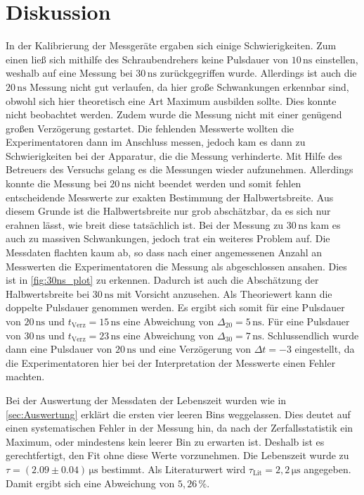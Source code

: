 \section{Diskussion}
\label{sec:Diskussion}

In der Kalibrierung der Messgeräte ergaben sich einige Schwierigkeiten.
Zum einen ließ sich mithilfe des Schraubendrehers keine Pulsdauer von $10 \, \unit{\nano\second}$ einstellen, weshalb auf eine Messung bei $30 \, \unit{\nano\second}$ zurückgegriffen wurde.
Allerdings ist auch die $20 \, \unit{\nano\second}$ Messung nicht gut verlaufen, da hier große Schwankungen erkennbar sind, obwohl sich hier theoretisch eine Art Maximum ausbilden sollte.
Dies konnte nicht beobachtet werden.
Zudem wurde die Messung nicht mit einer genügend großen Verzögerung gestartet.
Die fehlenden Messwerte wollten die Experimentatoren dann im Anschluss messen, jedoch kam es dann zu Schwierigkeiten bei der Apparatur, die die Messung verhinderte.
Mit Hilfe des Betreuers des Versuchs gelang es die Messungen wieder aufzunehmen.
Allerdings konnte die Messung bei $20 \, \unit{\nano\second}$ nicht beendet werden und somit fehlen entscheidende Messwerte zur exakten Bestimmung der Halbwertsbreite.
Aus diesem Grunde ist die Halbwertsbreite nur grob abschätzbar, da es sich nur erahnen lässt, wie breit diese tatsächlich ist.
Bei der Messung zu $30 \, \unit{\nano\second}$ kam es auch zu massiven Schwankungen, jedoch trat ein weiteres Problem auf.
Die Messdaten flachten kaum ab, so dass nach einer angemessenen Anzahl an Messwerten die Experimentatoren die Messung als abgeschlossen ansahen.
Dies ist in \autoref{fig:30ns_plot} zu erkennen.
Dadurch ist auch die Abschätzung der Halbwertsbreite bei $30 \, \unit{\nano\second}$ mit Vorsicht anzusehen.
Als Theoriewert kann die doppelte Pulsdauer genommen werden.
Es ergibt sich somit für eine Pulsdauer von $20 \, \unit{\nano\second}$ und  $t_\text{Verz} = 15 \, \unit{\nano\second}$ eine Abweichung von $\Delta_{20} = 5 \, \unit{\nano\second}$.
Für eine Pulsdauer von $30 \, \unit{\nano\second}$ und  $t_\text{Verz} = 23 \, \unit{\nano\second}$ eine Abweichung von $\Delta_{30} = 7 \, \unit{\nano\second}$.
Schlussendlich wurde dann eine Pulsdauer von $20 \, \unit{\nano\second}$ und eine Verzögerung von $\Delta t = -3$ eingestellt, da die Experimentatoren hier bei der Interpretation der Messwerte einen Fehler machten.

Bei der Auswertung der Messdaten der Lebenszeit wurden wie in \autoref{sec:Auswertung} erklärt die ersten vier leeren Bins weggelassen.
Dies deutet auf einen systematischen Fehler in der Messung hin, da nach der Zerfallsstatistik ein Maximum, oder mindestens kein leerer Bin zu erwarten ist.
Deshalb ist es gerechtfertigt, den Fit ohne diese Werte vorzunehmen.
Die Lebenszeit wurde zu $\tau = (2.09\pm 0.04) \, \unit{\micro\second}$ bestimmt.
Als Literaturwert wird $\tau_\text{Lit} = 2,2 \, \unit{\micro\second}$ angegeben.
Damit ergibt sich eine Abweichung von $5,26 \, \% $.

